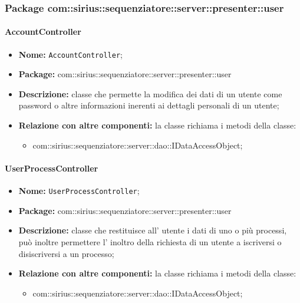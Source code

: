 \subsubsection{Package com::sirius::sequenziatore::server::presenter::user}
\paragraph{AccountController}
	\begin{itemize}
		\item \textbf{Nome:} \texttt{AccountController};
		\item \textbf{Package:} com::sirius::sequenziatore::server::presenter::user
		\item \textbf{Descrizione:} classe che permette la modifica dei dati di un utente come password o altre informazioni inerenti ai dettagli personali di un utente;
		\item \textbf{Relazione con altre componenti:} la classe richiama i metodi della classe:
		\begin{itemize}
			\item com::sirius::sequenziatore::server::dao::IDataAccessObject;
		\end{itemize}
	\end{itemize}
\paragraph{UserProcessController}
	\begin{itemize}
		\item \textbf{Nome:} \texttt{UserProcessController};
		\item \textbf{Package:} com::sirius::sequenziatore::server::presenter::user
		\item \textbf{Descrizione:} classe che restituisce all' utente i dati di uno o più processi, può inoltre permettere l' inoltro della richiesta di un utente a iscriversi o disiscriversi a un processo;
		\item \textbf{Relazione con altre componenti:} la classe richiama i metodi della classe:
		\begin{itemize}
			\item com::sirius::sequenziatore::server::dao::IDataAccessObject;
		\end{itemize}
	\end{itemize}
